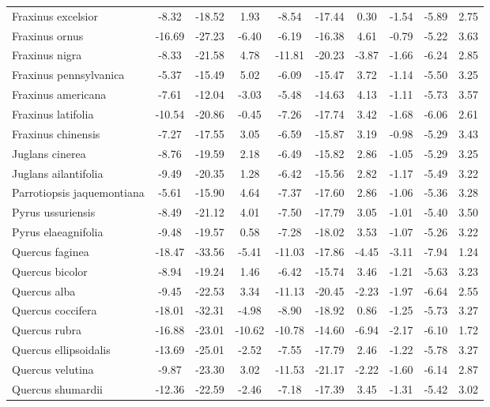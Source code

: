 \documentclass[11pt]{article}
\begin{document}
\begin{longtable}{p{1.50in}c{0.32in}c{0.32in}c{0.32in}c{0.32in}c{0.32in}c{0.32in}c{0.2in}c{0.3in}c{0.1in}}
  Fraxinus excelsior & -8.32 & -18.52 & 1.93 & -8.54 & -17.44 & 0.30 & -1.54 & -5.89 & 2.75 \\ 
  Fraxinus ornus & -16.69 & -27.23 & -6.40 & -6.19 & -16.38 & 4.61 & -0.79 & -5.22 & 3.63 \\ 
  Fraxinus nigra & -8.33 & -21.58 & 4.78 & -11.81 & -20.23 & -3.87 & -1.66 & -6.24 & 2.85 \\ 
  Fraxinus pennsylvanica & -5.37 & -15.49 & 5.02 & -6.09 & -15.47 & 3.72 & -1.14 & -5.50 & 3.25 \\ 
  Fraxinus americana & -7.61 & -12.04 & -3.03 & -5.48 & -14.63 & 4.13 & -1.11 & -5.73 & 3.57 \\ 
  Fraxinus latifolia & -10.54 & -20.86 & -0.45 & -7.26 & -17.74 & 3.42 & -1.68 & -6.06 & 2.61 \\ 
  Fraxinus chinensis & -7.27 & -17.55 & 3.05 & -6.59 & -15.87 & 3.19 & -0.98 & -5.29 & 3.43 \\ 
  Juglans cinerea & -8.76 & -19.59 & 2.18 & -6.49 & -15.82 & 2.86 & -1.05 & -5.29 & 3.25 \\ 
  Juglans ailantifolia & -9.49 & -20.35 & 1.28 & -6.42 & -15.56 & 2.82 & -1.17 & -5.49 & 3.22 \\ 
  Parrotiopsis jaquemontiana & -5.61 & -15.90 & 4.64 & -7.37 & -17.60 & 2.86 & -1.06 & -5.36 & 3.28 \\ 
  Pyrus ussuriensis & -8.49 & -21.12 & 4.01 & -7.50 & -17.79 & 3.05 & -1.01 & -5.40 & 3.50 \\ 
  Pyrus elaeagnifolia & -9.48 & -19.57 & 0.58 & -7.28 & -18.02 & 3.53 & -1.07 & -5.26 & 3.22 \\ 
  Quercus faginea & -18.47 & -33.56 & -5.41 & -11.03 & -17.86 & -4.45 & -3.11 & -7.94 & 1.24 \\ 
  Quercus bicolor & -8.94 & -19.24 & 1.46 & -6.42 & -15.74 & 3.46 & -1.21 & -5.63 & 3.23 \\ 
  Quercus alba & -9.45 & -22.53 & 3.34 & -11.13 & -20.45 & -2.23 & -1.97 & -6.64 & 2.55 \\ 
  Quercus coccifera & -18.01 & -32.31 & -4.98 & -8.90 & -18.92 & 0.86 & -1.25 & -5.73 & 3.27 \\ 
  Quercus rubra & -16.88 & -23.01 & -10.62 & -10.78 & -14.60 & -6.94 & -2.17 & -6.10 & 1.72 \\ 
  Quercus ellipsoidalis & -13.69 & -25.01 & -2.52 & -7.55 & -17.79 & 2.46 & -1.22 & -5.78 & 3.27 \\ 
  Quercus velutina & -9.87 & -23.30 & 3.02 & -11.53 & -21.17 & -2.22 & -1.60 & -6.14 & 2.87 \\ 
  Quercus shumardii & -12.36 & -22.59 & -2.46 & -7.18 & -17.39 & 3.45 & -1.31 & -5.42 & 3.02 \\ 

\end{longtable}
\end{document}
